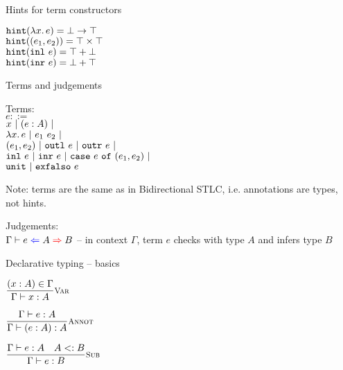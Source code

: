 \documentclass{beamer}
\begin{document}
\begin{frame}{Hints for term constructors}

\begin{center}
  $\hintfor{\fun{x}{e}} = \Fun{\Bot}{\Top}$ \\
  $\hintfor{\pair{e_1}{e_2}} = \Prod{\Top}{\Top}$ \\
  $\hintfor{\inl{e}} = \Sum{\Top}{\Bot}$ \\
  $\hintfor{\inr{e}} = \Sum{\Bot}{\Top}$
\end{center}

\end{frame}

\begin{frame}{Terms and judgements}

Terms: \\
$e ::=$ \\
\qquad $x \pipe \annot{e}{A} \pipe$ \\
\qquad $\fun{x}{e} \pipe \app{e_1}{e_2} \pipe$ \\
\qquad $\pair{e_1}{e_2} \pipe \outl{e} \pipe \outr{e} \pipe$ \\
\qquad $\inl{e} \pipe \inr{e} \pipe \case{e}{e_1}{e_2} \pipe$ \\
\qquad $\unit \pipe \exfalso{e}$

\vspace{2em}

Note: terms are the same as in Bidirectional STLC, i.e. annotations are types, not hints.

\vspace{2em}

Judgements: \\
$\fullhinting{\Gamma}{e}{A}{B}$ -- in context $\Gamma$, term $e$ checks with type $A$ and infers type $B$

\end{frame}

\begin{frame}{Declarative typing -- basics}

\begin{center}
  $\infrule[Var]{\sidecond{(x : A) \in \Gamma}}{\typing{x}{A}}$

  \vspace{2em}

  $\infrule[Annot]{\typing{e}{A}}{\typing{\annot{e}{A}}{A}}$

  \vspace{2em}

  $\infrule[Sub]{\typing{e}{A} \quad \sidecond{\subtyping{A}{B}}}{\typing{e}{B}}$
\end{center}

\end{frame}
\end{document}
